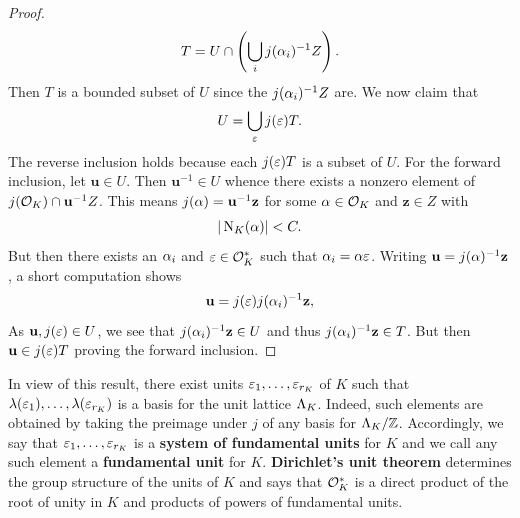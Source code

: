 \begin{proof}
      \[
        T = U \cap \left(\bigcup_{i}j(\alpha_{i})^{-1}Z\right).
      \]
      Then \(T\) is a bounded subset of \(U\) since the \(j(\alpha_{i})^{-1}Z\) are. We now claim that
      \[
        U = \bigcup_{\varepsilon}j(\varepsilon)T.
      \]
      The reverse inclusion holds because each \(j(\varepsilon)T\) is a subset of \(U\). For the forward inclusion, let \(\mathbf{u} \in U\). Then \(\mathbf{u}^{-1} \in U\) whence there exists a nonzero element of \(j(\mathcal{O}_{K}) \cap \mathbf{u}^{-1}Z\). This means \(j(\alpha) = \mathbf{u}^{-1}\mathbf{z}\) for some \(\alpha \in \mathcal{O}_{K}\) and \(\mathbf{z} \in Z\) with
      \[
        |\operatorname{\mathrm{N}}_{K}(\alpha)| < C.
      \]
      But then there exists an \(\alpha_{i}\) and \(\varepsilon \in \mathcal{O}_{K}^{\ast}\) such that \(\alpha_{i} = \alpha\varepsilon\). Writing \(\mathbf{u} = j(\alpha)^{-1}\mathbf{z}\), a short computation shows 
      \[
        \mathbf{u} = j(\varepsilon)j(\alpha_{i})^{-1}\mathbf{z},
      \]
      As \(\mathbf{u},j(\varepsilon) \in U\), we see that \(j(\alpha_{i})^{-1}\mathbf{z} \in U\) and thus \(j(\alpha_{i})^{-1}\mathbf{z} \in T\). But then \(\mathbf{u} \in j(\varepsilon)T\) proving the forward inclusion.
    \end{proof}

    In view of this result, there exist units \(\varepsilon_{1},\ldots,\varepsilon_{r_{K}}\) of \(K\) such that \(\lambda(\varepsilon_{1}),\ldots,\lambda(\varepsilon_{r_{K}})\) is a basis for the unit lattice \(\Lambda_{K}\). Indeed, such elements are obtained by taking the preimage under \(j\) of any basis for \(\Lambda_{K}/\mathbb{Z}\). Accordingly, we say that \(\varepsilon_{1},\ldots,\varepsilon_{r_{K}}\) is a \textbf{system of fundamental units} for \(K\) and we call any such element a \textbf{fundamental unit} for \(K\). \textbf{Dirichlet's unit theorem} determines the group structure of the units of \(K\) and says that \(\mathcal{O}_{K}^{\ast}\) is a direct product of the root of unity in \(K\) and products of powers of fundamental units.

